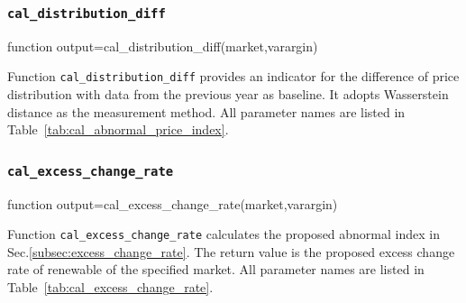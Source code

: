 \documentclass[10pt]{article}
\numberwithin{equation}{section}
\numberwithin{table}{section}
\numberwithin{figure}{section}
\begin{document}
\subsubsection{\texttt{cal\_distribution\_diff}}\label{func:cal_distribution_diff}

\begin{Code}
function output=cal_distribution_diff(market,varargin)
\end{Code}

Function \verb!cal_distribution_diff! provides an indicator for the difference of price distribution with data from the previous year as baseline. It adopts Wasserstein distance as the measurement method. All parameter names are listed in Table~\ref{tab:cal_abnormal_price_index}.



\subsubsection{\texttt{cal\_excess\_change\_rate}}\label{func:cal_excess_change_rate}

\begin{Code}
function output=cal_excess_change_rate(market,varargin)
\end{Code}

Function \verb!cal_excess_change_rate! calculates the proposed abnormal index in Sec.\ref{subsec:excess_change_rate}. The return value is the proposed excess change rate of renewable of the specified market. All parameter names are listed in Table~\ref{tab:cal_excess_change_rate}.
\end{document}
